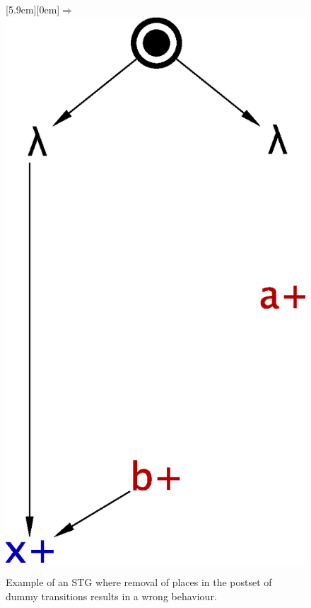 \begin{figure}[!tb]
    \hfill%
    \raisebox{5.9em}[5.9em][0em]{\Large$\Rightarrow$}
    \hfill%
    \includegraphics[scale=0.3]{EXPERIMENTS/stg/dummy_counterexample_removed}%
    \hfill%
    {}
    \caption{\label{fi-dummy-counterexample}
        Example of an STG where removal of places in the postset of dummy transitions results in a wrong behaviour.
    }
\end{figure}


